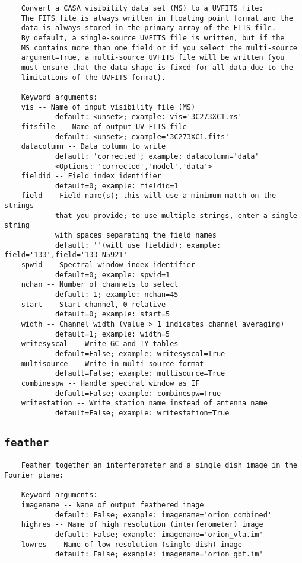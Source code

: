 \small
\begin{verbatim}
    Convert a CASA visibility data set (MS) to a UVFITS file:
    The FITS file is always written in floating point format and the
    data is always stored in the primary array of the FITS file.
    By default, a single-source UVFITS file is written, but if the
    MS contains more than one field or if you select the multi-source
    argument=True, a multi-source UVFITS file will be written (you
    must ensure that the data shape is fixed for all data due to the
    limitations of the UVFITS format).
    
    Keyword arguments:
    vis -- Name of input visibility file (MS)
            default: <unset>; example: vis='3C273XC1.ms'
    fitsfile -- Name of output UV FITS file
            default: <unset>; example='3C273XC1.fits'
    datacolumn -- Data column to write
            default: 'corrected'; example: datacolumn='data'
            <Options: 'corrected','model','data'>
    fieldid -- Field index identifier
            default=0; example: fieldid=1
    field -- Field name(s); this will use a minimum match on the strings
            that you provide; to use multiple strings, enter a single string
            with spaces separating the field names
            default: ''(will use fieldid); example: field='133',field='133 N5921'
    spwid -- Spectral window index identifier
            default=0; example: spwid=1
    nchan -- Number of channels to select
            default: 1; example: nchan=45
    start -- Start channel, 0-relative
            default=0; example: start=5
    width -- Channel width (value > 1 indicates channel averaging)
            default=1; example: width=5
    writesyscal -- Write GC and TY tables
            default=False; example: writesyscal=True
    multisource -- Write in multi-source format
            default=False; example: multisource=True
    combinespw -- Handle spectral window as IF
            default=False; example: combinespw=True
    writestation -- Write station name instead of antenna name
            default=False; example: writestation=True
\end{verbatim}
\normalsize


\subsection{{\tt feather}}
\label{section:tasks.feather}

\small
\begin{verbatim}
    Feather together an interferometer and a single dish image in the Fourier plane: 
    
    Keyword arguments:
    imagename -- Name of output feathered image
            default: False; example: imagename='orion_combined'
    highres -- Name of high resolution (interferometer) image
            default: False; example: imagename='orion_vla.im'
    lowres -- Name of low resolution (single dish) image
            default: False; example: imagename='orion_gbt.im'

\end{verbatim}
\normalsize


